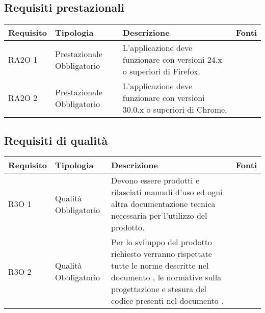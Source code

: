 \subsection{Requisiti prestazionali }

      \begin{center}
      \begin{longtable}{ | p{2cm} | p{2cm} | p{5cm} | p{2cm} |}
    
      \cellcolor[gray]{0.9} \textbf{Requisito} & \cellcolor[gray]{0.9} \textbf{Tipologia} 
      & \cellcolor[gray]{0.9} \textbf{Descrizione} & \cellcolor[gray]{0.9} \textbf{Fonti} \\ \hline
      
        RA2O 1 & Prestazionale \newline  Obbligatorio  & L’applicazione deve funzionare con versioni 24.x o superiori di Firefox. &  \\ \hline      
        RA2O 2 & Prestazionale \newline  Obbligatorio  & L’applicazione deve funzionare con versioni 30.0.x o superiori di Chrome. &  \\ \hline
      \end{longtable}
      \end{center}  
\clearpage

\subsection{Requisiti di qualità }

      \begin{center}
      \begin{longtable}{ | p{2cm} | p{2cm} | p{5cm} | p{2cm} |}
    
      \cellcolor[gray]{0.9} \textbf{Requisito} & \cellcolor[gray]{0.9} \textbf{Tipologia} 
      & \cellcolor[gray]{0.9} \textbf{Descrizione} & \cellcolor[gray]{0.9} \textbf{Fonti} \\ \hline
      
        R3O 1 & Qualità \newline  Obbligatorio  & Devono essere prodotti e rilasciati manuali d'uso ed ogni altra documentazione tecnica necessaria per l’utilizzo del prodotto. &  \\ \hline      
        R3O 2 & Qualità \newline  Obbligatorio  & Per lo sviluppo del prodotto richiesto verranno rispettate tutte le norme descritte nel documento \NormeDiProgetto{}, le normative sulla progettazione e stesura del codice presenti nel  documento \PianoDiQualifica{} . &  \\ \hline
      \end{longtable}
      \end{center}  
\clearpage

